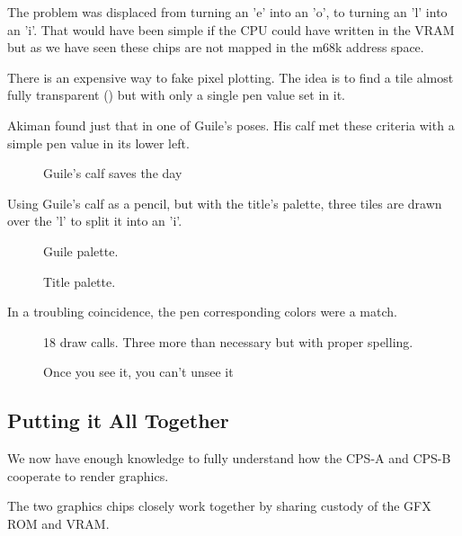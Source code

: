 The problem was displaced from turning an 'e' into an 'o', to turning an 'l' into an 'i'. That would have been simple if the CPU could have written in the VRAM but as we have seen these chips are not mapped in the m68k address space.

There is an expensive way to fake pixel plotting. The idea is to find a tile almost fully transparent () but with only a single pen value set in it. 

Akiman found just that in one of Guile's poses. His calf met these criteria with a simple pen value in its lower left.

\begin{figure}[H]
\caption*{Guile's calf saves the day}%
 \end{figure}%

Using Guile's calf as a pencil, but with the title's palette, three tiles are drawn over the 'l' to split it into an 'i'.

\begin{figure}[H]
 \caption*{Guile palette.}%
 \end{figure}%

 \begin{figure}[H]
 \caption*{Title palette.}%
 \end{figure}%


 In a troubling coincidence, the pen corresponding colors were a match.

\begin{figure}[H]
 \caption*{18 draw calls. Three more than necessary but with proper spelling.}%
 \end{figure}%

\begin{figure}[H]
 \caption*{Once you see it, you can't unsee it}%
 \end{figure}%



\subsection{Putting it All Together}

We now have enough knowledge to fully understand how the CPS-A and CPS-B cooperate to render graphics.

The two graphics chips closely work together by sharing custody of the GFX ROM and VRAM. 


